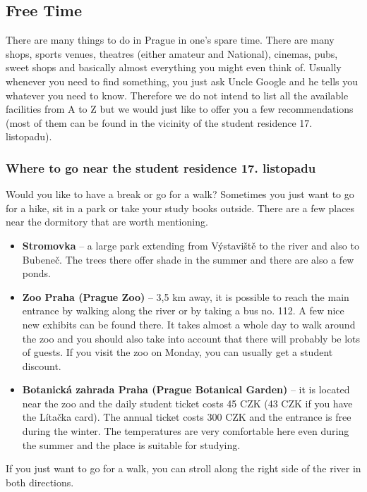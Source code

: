 \subsection{Free Time}
There are many things to do in Prague in one's spare time.
There are many shops, sports venues, theatres (either amateur and National),
cinemas, pubs, sweet shops and basically almost everything you might even think
of.
Usually whenever you need to find something, you just ask Uncle Google and he
tells you whatever you need to know.
Therefore we do not intend to list all the available facilities from A to Z but
we would just like to offer you a few recommendations (most of them can be found
in the vicinity of the student residence 17. listopadu).


\subsubsection{Where to go near the student residence 17. listopadu}
Would you like to have a break or go for a walk? Sometimes you just want to go
for a hike, sit in a park or take your study books outside.
There are a few places near the dormitory that are worth mentioning.
\begin{itemize}
\item \textbf{Stromovka} – a large park extending from Výstaviště to the river
and also to Bubeneč. The trees there offer shade in the summer and there are
also a few ponds.
\item \textbf{Zoo Praha (Prague Zoo)} – 3,5 km away, it is possible to reach the
main entrance by walking along the river or by taking a bus no. 112. A few nice
new exhibits can be found there.
It takes almost a whole day to walk around the zoo and you should also take into
account that there will probably be lots of guests.
If you visit the zoo on Monday, you can usually get a student discount.
\item \textbf{Botanická zahrada Praha (Prague Botanical Garden)} – it is located
near the zoo and the daily student ticket costs 45 CZK (43 CZK if you have the
Lítačka card). The annual ticket costs 300 CZK and the entrance is free during
the winter.
The temperatures are very comfortable here even during the summer and the place
is suitable for studying.
\end{itemize}
If you just want to go for a walk, you can stroll along the right side of the
river in both directions.


